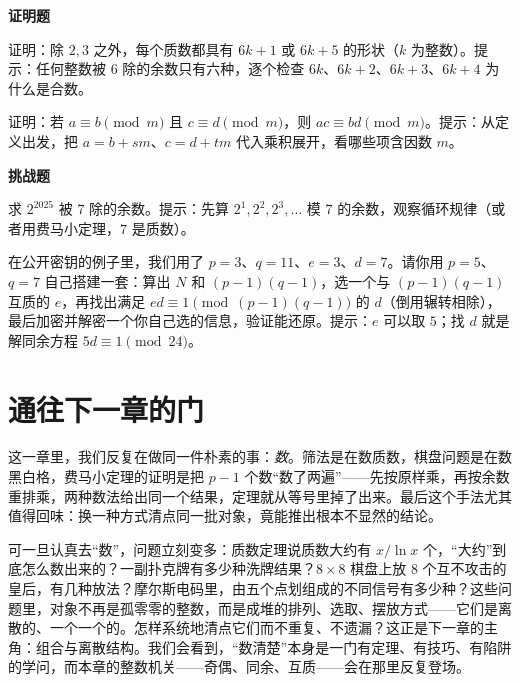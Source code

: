 \textbf{证明题}
\begin{sikao}
  \item 证明：除 $2,3$ 之外，每个质数都具有 $6k+1$ 或 $6k+5$ 的形状（$k$ 为整数）。提示：任何整数被 $6$ 除的余数只有六种，逐个检查 $6k$、$6k+2$、$6k+3$、$6k+4$ 为什么是合数。
  \item 证明：若 $a\equiv b\pmod{m}$ 且 $c\equiv d\pmod{m}$，则 $ac\equiv bd\pmod{m}$。提示：从定义出发，把 $a=b+sm$、$c=d+tm$ 代入乘积展开，看哪些项含因数 $m$。
\end{sikao}

\textbf{挑战题}
\begin{sikao}
  \item 求 $2^{2025}$ 被 $7$ 除的余数。提示：先算 $2^1,2^2,2^3,\dots$ 模 $7$ 的余数，观察循环规律（或者用费马小定理，$7$ 是质数）。
  \item 在公开密钥的例子里，我们用了 $p=3$、$q=11$、$e=3$、$d=7$。请你用 $p=5$、$q=7$ 自己搭建一套：算出 $N$ 和 $(p-1)(q-1)$，选一个与 $(p-1)(q-1)$ 互质的 $e$，再找出满足 $ed\equiv1\pmod{(p-1)(q-1)}$ 的 $d$（倒用辗转相除），最后加密并解密一个你自己选的信息，验证能还原。提示：$e$ 可以取 $5$；找 $d$ 就是解同余方程 $5d\equiv1\pmod{24}$。
\end{sikao}

\section*{通往下一章的门}

这一章里，我们反复在做同一件朴素的事：\emph{数}。筛法是在数质数，棋盘问题是在数黑白格，费马小定理的证明是把 $p-1$ 个数“数了两遍”——先按原样乘，再按余数重排乘，两种数法给出同一个结果，定理就从等号里掉了出来。最后这个手法尤其值得回味：换一种方式清点同一批对象，竟能推出根本不显然的结论。

可一旦认真去“数”，问题立刻变多：质数定理说质数大约有 $x/\ln x$ 个，“大约”到底怎么数出来的？一副扑克牌有多少种洗牌结果？$8\times8$ 棋盘上放 $8$ 个互不攻击的皇后，有几种放法？摩尔斯电码里，由五个点划组成的不同信号有多少种？这些问题里，对象不再是孤零零的整数，而是成堆的排列、选取、摆放方式——它们是离散的、一个一个的。怎样系统地清点它们而不重复、不遗漏？这正是下一章的主角：组合与离散结构。我们会看到，“数清楚”本身是一门有定理、有技巧、有陷阱的学问，而本章的整数机关——奇偶、同余、互质——会在那里反复登场。
